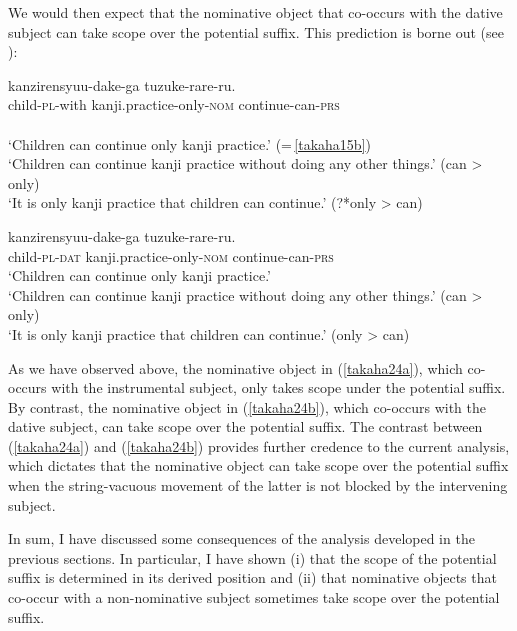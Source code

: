 \documentclass[output=paper]{langscibook}
\begin{document}
We would then expect that the nominative object that co-occurs with the dative subject can take scope over the potential suffix. This prediction is borne out (see \citealt{Ura1999, takahashi2011}):

\begin{exe}
\ex \label{takaha24}
\begin{xlist}
\ex \label{takaha24a}
	 {kanzirensyuu-dake-ga} {tuzuke-rare-ru.}\\
	child-\textsc{pl}-with  kanji.practice-only-\textsc{nom} continue-can-\textsc{prs}\\\\
	\glt ‘Children can continue only kanji practice.’ (=\,\ref{takaha15b})\\ 
	‘Children can continue kanji practice without doing any other things.’ (can \textgreater{} only)\\
	‘It is only kanji practice that children can continue.’ (?*only \textgreater{} can)
    	
\ex \label{takaha24b}
	 {kanzirensyuu-dake-ga} {tuzuke-rare-ru.}\\
	child-\textsc{pl}-\textsc{dat}       kanji.practice-only-\textsc{nom} continue-can-\textsc{prs}\\
	\glt ‘Children can continue only kanji practice.’ \\
	‘Children can continue kanji practice without doing any other things.’ (can \textgreater{} only)\\
	‘It is only kanji practice that children can continue.’ (only \textgreater{} can)
\end{xlist}
\end{exe}

As we have observed above, the nominative object in (\ref{takaha24a}), which co-occurs with the instrumental subject, only takes scope under the potential suffix. By contrast, the nominative object in (\ref{takaha24b}), which co-occurs with the dative subject, can take scope over the potential suffix. The contrast between (\ref{takaha24a}) and (\ref{takaha24b}) provides further credence to the current analysis, which dictates that the nominative object can take scope over the potential suffix when the string-vacuous movement of the latter is not blocked by the intervening subject.

In sum, I have discussed some consequences of the analysis developed in the previous sections. In particular, I have shown (i) that the scope of the potential suffix is determined in its derived position and (ii) that nominative objects that co-occur with a non-nominative subject sometimes take scope over the potential suffix.
\end{document}
